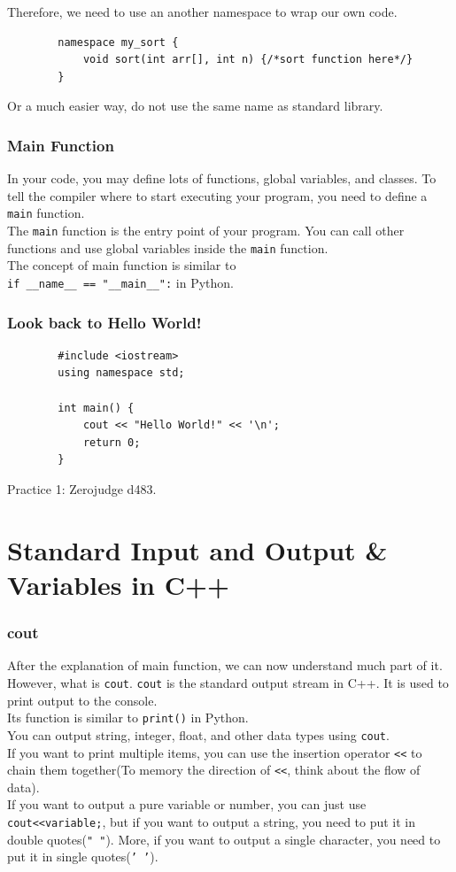 \documentclass[xcolor=dvipsnames]{beamer}
\begin{document}
    \begin{frame}[fragile]
        Therefore, we need to use an another namespace to wrap our own code.
        \begin{verbatim}
        namespace my_sort {
            void sort(int arr[], int n) {/*sort function here*/}
        }
        \end{verbatim}
        Or a much easier way, do not use the same name as standard library.
    \end{frame}

    \begin{frame}
        \frametitle{Main Function}
        In your code, you may define lots of functions, global variables, and classes. To tell the compiler where to start executing your program, you need to define a \texttt{main} function.\\
        The \texttt{main} function is the entry point of your program. You can call other functions and use global variables inside the \texttt{main} function.\\
        The concept of main function is similar to\\ \texttt{if \_\_name\_\_ == "\_\_main\_\_":} in Python.
    \end{frame}

    \begin{frame}[fragile]
        \frametitle{Look back to Hello World!}
        \begin{verbatim}
        #include <iostream>
        using namespace std;

        int main() {
            cout << "Hello World!" << '\n';
            return 0;
        }
        \end{verbatim}
        Practice 1: Zerojudge d483.
    \end{frame}

    \section{Standard Input and Output \& Variables in C++}
    \begin{frame}
        \frametitle{cout}
        After the explanation of main function, we can now understand much part of it. However, what is \texttt{cout}.
        \texttt{cout} is the standard output stream in C++. It is used to print output to the console.\\Its function is similar to \texttt{print()} in Python.\\
        You can output string, integer, float, and other data types using \texttt{cout}.\\
        If you want to print multiple items, you can use the insertion operator \texttt{<<} to chain them together(To memory the direction of \texttt{<<}, think about the flow of data).\\
        If you want to output a pure variable or number, you can just use \texttt{cout<<variable;}, but if you want to output a string, you need to put it in double quotes(\texttt{" "}). More, if you want to output a single character, you need to put it in single quotes(\texttt{' '}).
    \end{frame}
\end{document}
